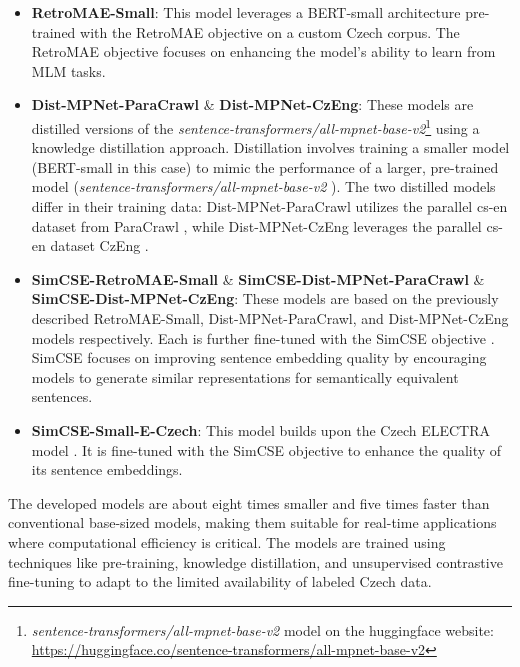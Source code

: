 \begin{itemize}
  \item \textbf{RetroMAE-Small}:
    This model leverages a \ac{BERT}-small architecture pre-trained with the \ac{RetroMAE} objective \cite{xiao2022retromae} on a custom Czech corpus.
    The \ac{RetroMAE} objective focuses on enhancing the model's ability to learn from \ac{MLM} tasks.
  \item \textbf{Dist-MPNet-ParaCrawl} \& \textbf{Dist-MPNet-CzEng}:
    These models are distilled versions of the \textit{sentence-transformers/all-mpnet-base-v2}\footnote{\label{hf_all-mpnet-base-v2}\textit{sentence-transformers/all-mpnet-base-v2} model on the huggingface website: \url{https://huggingface.co/sentence-transformers/all-mpnet-base-v2}} using a knowledge distillation approach.
    Distillation involves training a smaller model (\ac{BERT}-small in this case) to mimic the performance of a larger, pre-trained model (\textit{sentence-transformers/all-mpnet-base-v2} ).
    The two distilled models differ in their training data: Dist-MPNet-ParaCrawl utilizes the parallel cs-en dataset from ParaCrawl \cite{espla2019paracrawl}, while Dist-MPNet-CzEng leverages the parallel cs-en dataset CzEng \cite{kocmi2020announcing}.
  \item \textbf{SimCSE-RetroMAE-Small} \& \textbf{SimCSE-Dist-MPNet-ParaCrawl} \& \textbf{SimCSE-Dist-MPNet-CzEng}:
    These models are based on the previously described RetroMAE-Small, Dist-MPNet-ParaCrawl, and Dist-MPNet-CzEng models respectively.
    Each is further fine-tuned with the \ac{SimCSE} objective \cite{gao2022simcse}.
    \ac{SimCSE} focuses on improving sentence embedding quality by encouraging models to generate similar representations for semantically equivalent sentences.
  \item \textbf{SimCSE-Small-E-Czech}:
    This model builds upon the Czech ELECTRA model \cite{kocián2021siamese}.
    It is fine-tuned with the \ac{SimCSE} \cite{gao2022simcse} objective to enhance the quality of its sentence embeddings.    
\end{itemize}

The developed models are about eight times smaller and five times faster than conventional base-sized models, making them suitable for real-time applications where computational efficiency is critical.
The models are trained using techniques like pre-training, knowledge distillation, and unsupervised contrastive fine-tuning to adapt to the limited availability of labeled Czech data.



